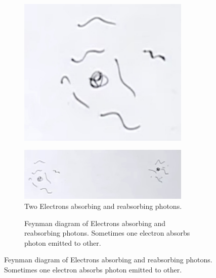 \documentclass[]{article}
\begin{document}
\begin{figure}[H]
\begin{subfigure}{0.45\textwidth}
		\includegraphics[width=0.9\textwidth]{2-1-electron-photons}
	\end{subfigure}
	\begin{subfigure}{0.45\textwidth}
		\caption{Two Electrons absorbing and reabsorbing photons.}\label{fig:2-1-second-electron-photons}
		\includegraphics[width=0.9\textwidth]{2-1-second-electron-photons}
	\end{subfigure}
		\begin{subfigure}{0.45\textwidth}
		\caption{Feynman diagram of Electrons absorbing and reabsorbing photons. Sometimes one electron absorbs photon emitted to other.}\label{fig:2-1-electron-photons-feynmann}

\end{subfigure}
\end{figure}
\end{document}
